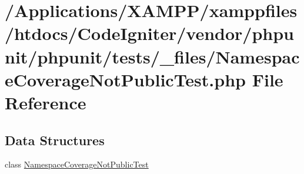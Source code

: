 \hypertarget{phpunit_2tests_2__files_2_namespace_coverage_not_public_test_8php}{}\section{/\+Applications/\+X\+A\+M\+P\+P/xamppfiles/htdocs/\+Code\+Igniter/vendor/phpunit/phpunit/tests/\+\_\+files/\+Namespace\+Coverage\+Not\+Public\+Test.php File Reference}
\label{phpunit_2tests_2__files_2_namespace_coverage_not_public_test_8php}
\subsection*{Data Structures}
\begin{DoxyCompactItemize}
\item 
class \mbox{\hyperlink{class_namespace_coverage_not_public_test}{Namespace\+Coverage\+Not\+Public\+Test}}
\end{DoxyCompactItemize}
